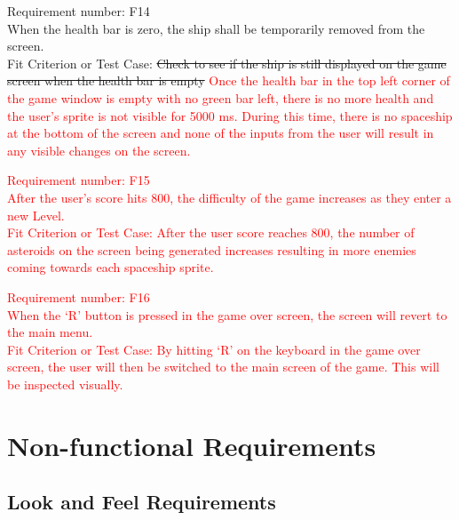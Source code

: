 \documentclass[12pt, titlepage]{article}
\begin{document}
\noindent Requirement number: F14
\\When the health bar is zero, the ship shall be temporarily removed from the screen.
\\Fit Criterion or Test Case: \sout{Check to see if the ship is still displayed on the game screen when the health bar is empty}
\textcolor{red}{Once the health bar in the top left corner of the game window is empty with no green bar left, there is no more health and the user's sprite is not visible for 5000 ms. During this time, there is no spaceship at the bottom of the screen and none of the inputs from the user will result in any visible changes on the screen.}
\bigskip

\noindent \textcolor{red}{Requirement number: F15
\\After the user's score hits 800, the difficulty of the game increases as they enter a new Level.
\\Fit Criterion or Test Case: After the user score reaches 800, the number of asteroids on the screen being generated increases resulting in more enemies coming towards each spaceship sprite. }
\bigskip

\noindent \textcolor{red}{Requirement number: F16
\\When the `R' button is pressed in the game over screen, the screen will revert to the main menu.
\\Fit Criterion or Test Case: By hitting `R' on the keyboard in the game over screen, the user will then be switched to the main screen of the game. This will be inspected visually. }


\newpage

\section{Non-functional Requirements}

\subsection{Look and Feel Requirements}
\end{document}
